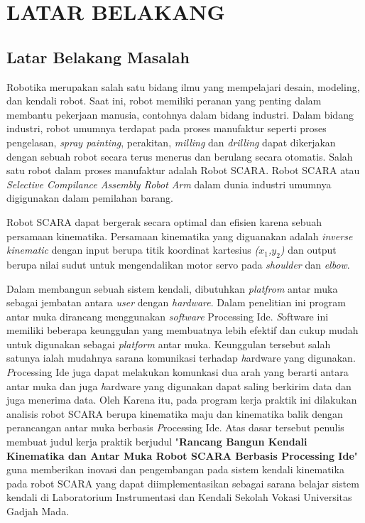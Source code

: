 
\chapter{LATAR BELAKANG}

\section{Latar Belakang Masalah}
	Robotika merupakan salah satu bidang ilmu yang mempelajari desain, modeling, dan kendali robot. Saat ini, robot memiliki peranan yang penting dalam membantu pekerjaan manusia, contohnya dalam bidang industri. Dalam bidang industri, robot umumnya terdapat pada proses manufaktur seperti proses pengelasan, \textit{spray painting}, perakitan, \textit{milling} dan \textit{drilling} dapat dikerjakan dengan sebuah robot secara terus menerus dan berulang secara otomatis. Salah satu robot dalam proses manufaktur adalah Robot SCARA. Robot SCARA atau \emph{Selective Compilance Assembly Robot Arm} dalam dunia industri umumnya digigunakan dalam pemilahan barang. 
	
Robot SCARA dapat bergerak secara optimal dan efisien karena sebuah persamaan kinematika. Persamaan kinematika yang diguanakan adalah \textit{inverse kinematic} dengan input berupa titik koordinat kartesius \textit{($x_{1}$,$y_{2}$)} dan output berupa nilai sudut untuk mengendalikan motor servo pada \textit{shoulder} dan \textit{elbow}.

Dalam membangun sebuah sistem kendali, dibutuhkan \textit{platfrom} antar muka sebagai jembatan antara \textit{user} dengan \textit{hardware}. Dalam penelitian ini program antar muka dirancang menggunakan \textit{software} Processing Ide. \emph Software ini memiliki beberapa keunggulan yang membuatnya lebih efektif dan cukup mudah untuk digunakan sebagai \textit{platform} antar muka. Keunggulan tersebut salah satunya ialah mudahnya sarana komunikasi terhadap \emph hardware yang digunakan. \emph Processing Ide juga dapat melakukan komunkasi dua arah yang berarti antara antar muka dan juga \emph hardware yang digunakan dapat saling berkirim data dan juga menerima data.
Oleh Karena itu, pada program kerja praktik ini dilakukan analisis robot SCARA berupa kinematika maju dan kinematika balik dengan perancangan antar muka berbasis \emph Processing Ide. Atas dasar tersebut penulis membuat judul kerja praktik berjudul "\textbf{Rancang Bangun Kendali Kinematika dan Antar Muka Robot SCARA Berbasis Processing Ide}" guna memberikan inovasi dan pengembangan pada sistem kendali kinematika pada robot SCARA yang dapat diimplementasikan sebagai sarana belajar sistem kendali di Laboratorium Instrumentasi dan Kendali Sekolah Vokasi Universitas Gadjah Mada.\\

